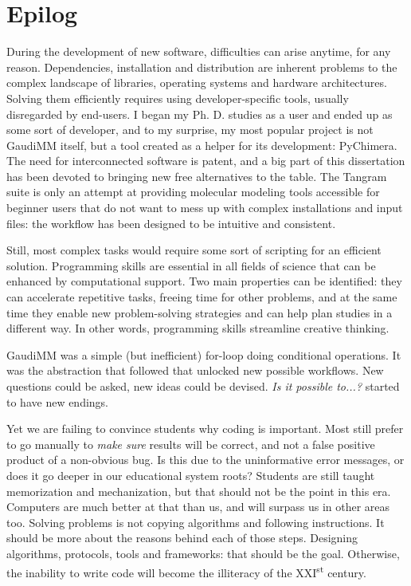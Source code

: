 \chapter*{Epilog}
\label{chap:epilog}

During the development of new software, difficulties can arise anytime, for any reason. Dependencies, installation and distribution are inherent problems to the complex landscape of libraries, operating systems and hardware architectures. Solving them efficiently requires using developer-specific tools, usually disregarded by end-users. I began my Ph. D. studies as a user and ended up as some sort of developer, and to my surprise, my most popular project is not GaudiMM itself, but a tool created as a helper for its development: PyChimera. The need for interconnected software is patent, and a big part of this dissertation has been devoted to bringing new free alternatives to the table. The Tangram suite is only an attempt at providing molecular modeling tools accessible for beginner users that do not want to mess up with complex installations and input files: the workflow has been designed to be intuitive and consistent.

Still, most complex tasks would require some sort of scripting for an efficient solution. Programming skills are essential in all fields of science that can be enhanced by computational support. Two main properties can be identified: they can accelerate repetitive tasks, freeing time for other problems, and at the same time they enable new problem-solving strategies and can help plan studies in a different way. In other words, programming skills streamline creative thinking.

GaudiMM was a simple (but inefficient) for-loop doing conditional operations. It was the abstraction that followed that unlocked new possible workflows. New questions could be asked, new ideas could be devised. \textit{Is it possible to...?} started to have new endings.

Yet we are failing to convince students why coding is important. Most still prefer to go manually to \textit{make sure} results will be correct, and not a false positive product of a non-obvious bug. Is this due to the uninformative error messages, or does it go deeper in our educational system roots? Students are still taught memorization and mechanization, but that should not be the point in this era. Computers are much better at that than us, and will surpass us in other areas too. Solving problems is not copying algorithms and following instructions. It should be more about the reasons behind each of those steps. Designing algorithms, protocols, tools and frameworks: that should be the goal. Otherwise, the inability to write code will become the illiteracy of the XXI\textsuperscript{st} century.